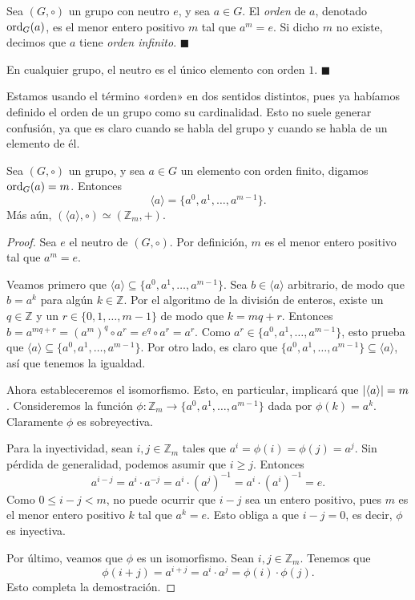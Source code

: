 \begin{definition}\label{def_orden}
	Sea $(G,\circ)$ un grupo con neutro $e$, y sea $a \in G$. El \emph{orden} de $a$, denotado $\mathrm{ord}_{G}(a)$, es el menor entero positivo $m$ tal que $a^m = e$. Si dicho $m$ no existe, decimos que $a$ tiene \emph{orden infinito}. \hfill$\blacksquare$
\end{definition} 

\begin{remark}
En cualquier grupo, el neutro es el único elemento con orden $1$. \hfill$\blacksquare$
\end{remark}

Estamos usando el término «orden» en dos sentidos distintos, pues ya habíamos definido el orden de un grupo como su cardinalidad. Esto no suele generar confusión, ya que es claro cuando se habla del grupo y cuando se habla de un elemento de él. 

\begin{proposition} \label{prop-orden}
Sea $(G, \circ)$ un grupo, y sea $a \in G$ un elemento con orden finito, digamos $\mathrm{ord}_{G}(a) = m$. Entonces
$$\langle a \rangle = \{ a^0, a^1, \dots, a^{m-1}\}.$$
Más aún, $(\langle a \rangle, \circ) \simeq (\mathbb{Z}_m, +)$.
\end{proposition}

\begin{proof} Sea $e$ el neutro de $(G, \circ)$. Por definición, $m$ es el menor entero positivo tal que $a^m = e$.

Veamos primero que $\langle a \rangle \subseteq \{ a^0, a^1, \dots, a^{m-1}\}$. Sea $b \in \langle a \rangle$ arbitrario, de modo que $b = a^k$ para algún $k \in \mathbb{Z}$. Por el algoritmo de la división de enteros, existe un $q \in \mathbb{Z}$ y un $r \in \{0, 1, \dots, m-1\}$ de modo que $k = mq+r$. Entonces $b = a^{mq+r} = \left(a^m\right)^q \circ a^r = e^q \circ a^r = a^r$. Como $a^r \in \{ a^0, a^1, \dots, a^{m-1}\}$, esto prueba que $\langle a \rangle \subseteq \{ a^0, a^1, \dots, a^{m-1}\}$. Por otro lado, es claro que $\{ a^0, a^1, \dots, a^{m-1}\} \subseteq \langle a \rangle$, así que tenemos la igualdad.

Ahora estableceremos el isomorfismo. Esto, en particular, implicará que $\lvert\langle a \rangle\rvert = m$. Consideremos la función $\phi\colon \mathbb{Z}_m \rightarrow \{ a^0, a^1, \dots, a^{m-1}\}$ dada por $\phi(k) = a^k$. Claramente $\phi$ es sobreyectiva.

Para la inyectividad, sean $i, j \in \mathbb{Z}_m$ tales que $a^i = \phi(i) = \phi(j) = a^j$. Sin pérdida de generalidad, podemos asumir que $i \geq j$. Entonces $$a^{i - j} = a^i \cdot a^{-j} = a^i \cdot \left(a^j \right)^{-1} = a^i \cdot \left(a^i \right)^{-1} = e.$$
Como $0 \leq i - j < m$, no puede ocurrir que $i-j$ sea un entero positivo, pues $m$ es el menor entero positivo $k$ tal que $a^k = e$. Esto obliga a que $i-j = 0$, es decir, $\phi$ es inyectiva.

Por último, veamos que $\phi$ es un isomorfismo. Sean $i, j \in \mathbb{Z}_m$. Tenemos que
$$\phi(i + j) = a^{i+j} = a^i \cdot a^j = \phi(i) \cdot \phi(j).$$ Esto completa la demostración.
\end{proof}


